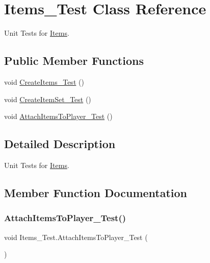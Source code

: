 \hypertarget{class_items___test}{}\section{Items\+\_\+\+Test Class Reference}
\label{class_items___test}


Unit Tests for \mbox{\hyperlink{class_items}{Items}}.  


\subsection*{Public Member Functions}
\begin{DoxyCompactItemize}
\item 
void \mbox{\hyperlink{class_items___test_af3d9432fd0dacf8716a1e0a50e642df3}{Create\+Items\+\_\+\+Test}} ()
\item 
void \mbox{\hyperlink{class_items___test_a2891c44bc7f9131017df9cddb5fc163c}{Create\+Item\+Set\+\_\+\+Test}} ()
\item 
void \mbox{\hyperlink{class_items___test_a806431bc31e50464f95323f395057066}{Attach\+Items\+To\+Player\+\_\+\+Test}} ()
\end{DoxyCompactItemize}


\subsection{Detailed Description}
Unit Tests for \mbox{\hyperlink{class_items}{Items}}. 

\subsection{Member Function Documentation}
\mbox{\label{class_items___test_a806431bc31e50464f95323f395057066}} 
\subsubsection{\texorpdfstring{AttachItemsToPlayer\_Test()}{AttachItemsToPlayer\_Test()}}
{\footnotesize\ttfamily void Items\+\_\+\+Test.\+Attach\+Items\+To\+Player\+\_\+\+Test (\begin{DoxyParamCaption}{ }\end{DoxyParamCaption})\hspace{0.3cm}{\ttfamily [inline]}}

